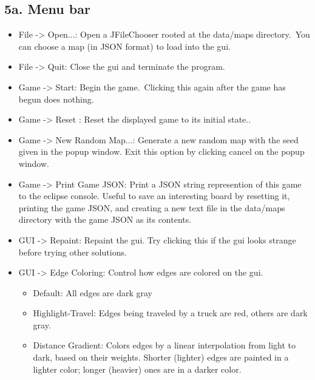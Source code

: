 \documentclass[11pt]{article}
\begin{document}
\subsection{5a. Menu bar}
\begin{itemize}
\item File -> Open...: Open a JFileChooser rooted at the data/maps directory.\ You can choose a map (in JSON format) to load into the gui.
\item File -> Quit:  Close the gui and terminate the program.
\item Game -> Start: Begin the game.\ Clicking this again after the game has begun does nothing.
\item Game -> Reset : Reset the displayed game to its initial state..
\item Game -> New Random Map...: Generate a new random map with the seed given in the popup window. Exit this option by clicking cancel on the popup window.
\item Game -> Print Game JSON: Print a JSON string represention of this game to the eclipse console. Useful to save an interesting board by resetting it, printing the game JSON, and creating a new text file in the data/maps directory with the game JSON as its contents.
\item GUI -> Repaint: Repaint the gui. Try clicking this if the gui looks strange before trying other solutions.
\item GUI -> Edge Coloring: Control how edges are colored on the gui.
\begin{itemize}
\item Default: All edges are dark gray
\item Highlight-Travel: Edges being traveled by a truck are red, others are dark gray.
\item Distance Gradient: Colors edges by a linear interpolation from light to dark, based on their weights. Shorter (lighter) edges are painted in a lighter color; longer (heavier) ones are in a  darker color.
\end{itemize}
\end{itemize}
\end{document}
